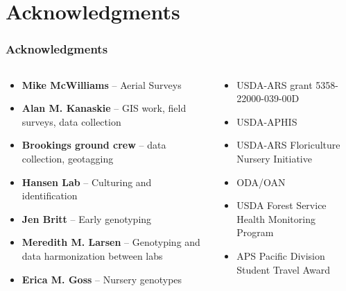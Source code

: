 \documentclass{beamer}\usepackage[]{graphicx}\usepackage[]{color}
\begin{document}
\section*{Acknowledgments}
\begin{frame}[T]
\frametitle{Acknowledgments}
	\begin{columns}[T]

		\begin{column}{0.5\paperwidth}
			\begin{itemize}
				\item \textbf{Mike McWilliams} -- Aerial Surveys
				\item \textbf{Alan M. Kanaskie} -- GIS work, field surveys, data collection
				\item \textbf{Brookings ground crew} -- data collection, geotagging
				\item \textbf{Hansen Lab} -- Culturing and identification
				\item \textbf{Jen Britt} -- Early genotyping
				\item \textbf{Meredith M. Larsen} -- Genotyping and data harmonization between labs
				\item \textbf{Erica M. Goss} -- Nursery genotypes
			\end{itemize}
		\end{column}

		\begin{column}{0.5\paperwidth}
			\begin{itemize}
				\item USDA-ARS grant 5358-22000-039-00D
				\item USDA-APHIS
				\item USDA-ARS Floriculture Nursery Initiative
				\item ODA/OAN
				\item USDA Forest Service Health Monitoring Program
				\item APS Pacific Division Student Travel Award
			\end{itemize}
		\end{column}

	\end{columns}
\end{frame}
\end{document}

